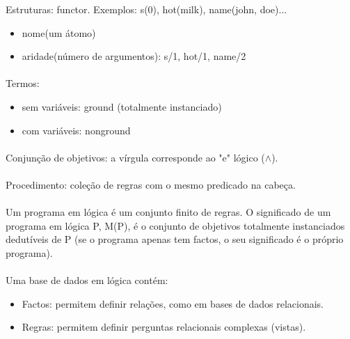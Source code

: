 \documentclass[../resumosPLOG.tex]{subfiles}
\begin{document}
Estruturas: functor. Exemplos: s(0), hot(milk), name(john, doe)...
\begin{itemize}
    \item nome(um átomo)
    \item aridade(número de argumentos): s/1, hot/1, name/2
\end{itemize}

\paragraph{}

Termos:
\begin{itemize}
    \item sem variáveis: ground (totalmente instanciado)
    \item com variáveis: nonground
\end{itemize}

\paragraph{}

Conjunção de objetivos: a vírgula corresponde ao "e" lógico (\(\wedge\)).

\paragraph{}

Procedimento: coleção de regras com o mesmo predicado na cabeça.

\paragraph{}

Um programa em lógica é um conjunto finito de regras.
O significado de um programa em lógica P, M(P), é o conjunto de objetivos totalmente instanciados dedutíveis de P (se o programa apenas tem factos, o seu significado é o próprio programa).

\paragraph{}

Uma base de dados em lógica contém:
\begin{itemize}
    \item Factos: permitem definir relações, como em bases de dados relacionais.
    \item Regras: permitem definir perguntas relacionais complexas (vistas).
\end{itemize}
\end{document}
